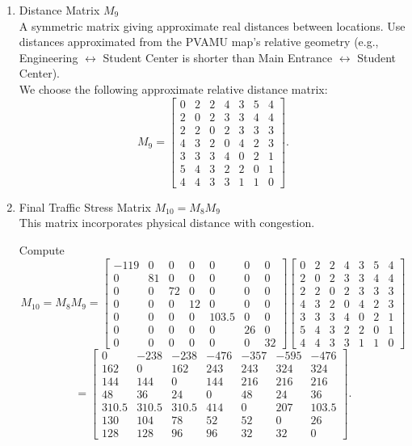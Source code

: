 \documentclass{ximera}
\begin{document}
\begin{enumerate}
    \item Distance Matrix $M_9$\\
    A symmetric matrix giving approximate real distances between locations. Use distances approximated from the PVAMU map's relative geometry (e.g., Engineering $\leftrightarrow$ Student Center is shorter than Main Entrance $\leftrightarrow$ Student Center).\\

    We choose the following approximate relative distance matrix:
    \[
    M_9=
    \begin{bmatrix}
    0&2&2&4&3&5&4\\
    2&0&2&3&3&4&4\\
    2&2&0&2&3&3&3\\
    4&3&2&0&4&2&3\\
    3&3&3&4&0&2&1\\
    5&4&3&2&2&0&1\\
    4&4&3&3&1&1&0
    \end{bmatrix}.
    \]

    \item Final Traffic Stress Matrix $M_10=M_8M_9$\\
    This matrix incorporates physical distance with congestion.

    Compute
    \[
    M_{10}=M_8M_9=
    \begin{bmatrix}
    -119&0&0&0&0&0&0\\
    0&81&0&0&0&0&0\\
    0&0&72&0&0&0&0\\
    0&0&0&12&0&0&0\\
    0&0&0&0&103.5&0&0\\
    0&0&0&0&0&26&0\\
    0&0&0&0&0&0&32
    \end{bmatrix}
    \begin{bmatrix}
    0&2&2&4&3&5&4\\
    2&0&2&3&3&4&4\\
    2&2&0&2&3&3&3\\
    4&3&2&0&4&2&3\\
    3&3&3&4&0&2&1\\
    5&4&3&2&2&0&1\\
    4&4&3&3&1&1&0
    \end{bmatrix}
    \]
    \[
    =
    \begin{bmatrix}
    0&-238&-238&-476&-357&-595&-476\\
    162&0&162&243&243&324&324\\
    144&144&0&144&216&216&216\\
    48&36&24&0&48&24&36\\
    310.5&310.5&310.5&414&0&207&103.5\\
    130&104&78&52&52&0&26\\
    128&128&96&96&32&32&0
    \end{bmatrix}.
    \]
\end{enumerate}
\end{document}

